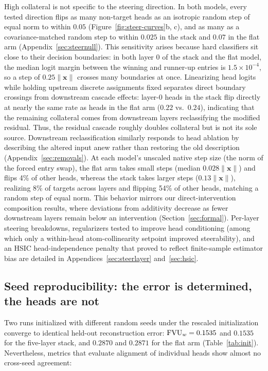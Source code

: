 High collateral is not specific to the steering direction. In both models,
every tested direction flips as many non-target heads as an isotropic random
step of equal norm to within $0.05$ (Figure~\ref{fig:steer-curves}b, c), and
as many as a covariance-matched random step to within $0.025$ in the stack
and $0.07$ in the flat arm (Appendix~\ref{sec:steernull}). This sensitivity
arises because hard classifiers sit close to their decision boundaries: in
both layer 0 of the stack and the flat model, the median logit margin
between the winning and runner-up entries is $1.5\times10^{-4}$, so a step
of $0.25\lVert\mathbf{x}\rVert$ crosses many boundaries at once. Linearizing
head logits while holding upstream discrete assignments fixed separates
direct boundary crossings from downstream cascade effects: layer-0 heads in
the stack flip directly at nearly the same rate as heads in the flat arm
($0.22$ vs.\ $0.24$), indicating that the remaining collateral comes from
downstream layers reclassifying the modified residual. Thus, the residual
cascade roughly doubles collateral but is not its sole source. Downstream
reclassification similarly responds to head ablation by describing the
altered input anew rather than restoring the old description
(Appendix~\ref{sec:removals}). At each model's unscaled
native step size (the norm of the forced entry swap), the flat arm takes
small steps (median $0.028\lVert\mathbf{x}\rVert$) and flips 4\% of other
heads, whereas the stack takes larger steps ($0.13\lVert\mathbf{x}\rVert$),
realizing 8\% of targets across layers and flipping 54\% of other heads,
matching a random step of equal norm. This behavior mirrors our
direct-intervention composition results, where deviations from additivity
decrease as fewer downstream layers remain below an intervention
(Section~\ref{sec:formal}). Per-layer steering breakdowns, regularizers
tested to improve head conditioning (among which only a within-head
atom-collinearity setpoint improved steerability), and an HSIC
head-independence penalty that proved to reflect finite-sample estimator bias
are detailed in Appendices~\ref{sec:steerlayer} and~\ref{sec:hsic}.

\subsection{Seed reproducibility: the error is determined, the heads are not}
\label{sec:seeds}

Two runs initialized with different random seeds under the rescaled
initialization converge to identical held-out reconstruction error:
$\mathrm{FVU}_w = 0.1535$ and $0.1535$ for the five-layer stack, and $0.2870$ and
$0.2871$ for the flat arm (Table~\ref{tab:init}). Nevertheless, metrics that
evaluate alignment of individual heads show almost no cross-seed agreement:

